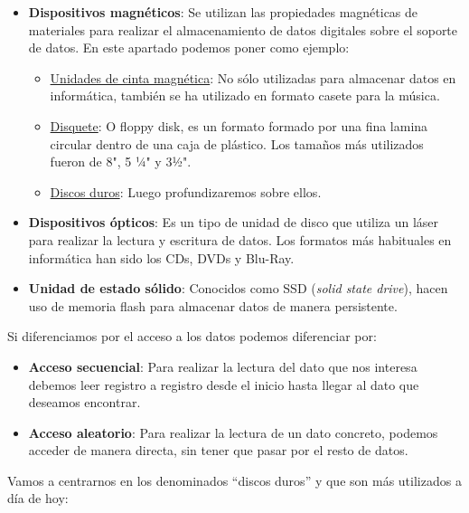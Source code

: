 \begin{itemize}
    \item \textbf{Dispositivos magnéticos}: Se utilizan las propiedades magnéticas de materiales para realizar el almacenamiento de datos digitales sobre el soporte de datos. En este apartado podemos poner como ejemplo:
    \begin{itemize}
        \item \href{https://es.wikipedia.org/wiki/Cinta_magn%C3%A9tica_de_almacenamiento_de_datos}{Unidades de cinta magnética}: No sólo utilizadas para almacenar datos en informática, también se ha utilizado en formato casete para la música.
        \item \href{https://es.wikipedia.org/wiki/Disquete}{Disquete}: O floppy disk, es un formato formado por una fina lamina circular dentro de una caja de plástico. Los tamaños más utilizados fueron de 8", 5 ¼" y 3½".
        \item \href{https://es.wikipedia.org/wiki/Unidad_de_disco_duro}{Discos duros}: Luego profundizaremos sobre ellos.
    \end{itemize}

    \item \textbf{Dispositivos ópticos}: Es un tipo de unidad de disco que utiliza un láser para realizar la lectura y escritura de datos. Los formatos más habituales en informática han sido los CDs, DVDs y Blu-Ray.

    \item \textbf{Unidad de estado sólido}: Conocidos como SSD (\textit{solid state drive}), hacen uso de memoria flash para almacenar datos de manera persistente.
\end{itemize}


Si diferenciamos por el acceso a los datos podemos diferenciar por:

\begin{itemize}
    \item \textbf{Acceso secuencial}: Para realizar la lectura del dato que nos interesa debemos leer registro a registro desde el inicio hasta llegar al dato que deseamos encontrar.

    \item \textbf{Acceso aleatorio}: Para realizar la lectura de un dato concreto, podemos acceder de manera directa, sin tener que pasar por el resto de datos.
\end{itemize}

Vamos a centrarnos en los denominados “discos duros” y que son  más utilizados a día de hoy:

